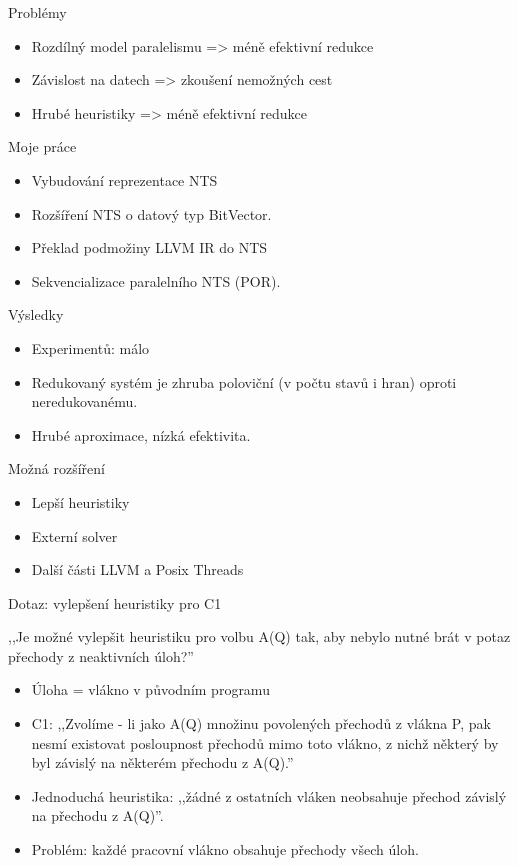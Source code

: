 \documentclass[11pt]{beamer}
\begin{document}
\begin{frame}{Problémy}
\begin{itemize}
\item Rozdílný model paralelismu => méně efektivní redukce
\item Závislost na datech => zkoušení nemožných cest
\item Hrubé heuristiky => méně efektivní redukce
\end{itemize}
\end{frame}


\begin{frame}{Moje práce}
\begin{itemize}
\item Vybudování reprezentace NTS
\item Rozšíření NTS o datový typ BitVector.
\item Překlad podmožiny LLVM IR do NTS
\item Sekvencializace paralelního NTS (POR).
\end{itemize}
\end{frame}

\begin{frame}{Výsledky}
\begin{itemize}
\item Experimentů: málo
\item Redukovaný systém je zhruba poloviční (v počtu stavů i hran) oproti neredukovanému.
\item Hrubé aproximace, nízká efektivita.
\end{itemize}
\end{frame}

\begin{frame}{Možná rozšíření}
\begin{itemize}
\item Lepší heuristiky
\item Externí solver
\item Další části LLVM a Posix Threads
\end{itemize}
\end{frame}

\begin{frame}{Dotaz: vylepšení heuristiky pro C1}
\begin{question}
,,Je možné vylepšit heuristiku pro volbu A(Q) tak, aby nebylo nutné brát v potaz přechody z neaktivních úloh?''
\end{question}
\begin{itemize}
\item Úloha = vlákno v původním programu
\item C1: ,,Zvolíme - li jako A(Q) množinu povolených přechodů z vlákna P, pak nesmí existovat posloupnost přechodů mimo toto vlákno, z nichž některý by byl závislý na některém přechodu z A(Q).''
\item Jednoduchá heuristika: ,,žádné z ostatních vláken neobsahuje přechod závislý na přechodu z A(Q)''.
\item Problém: každé pracovní vlákno obsahuje přechody všech úloh.
\end{itemize}
\end{frame}
\end{document}
